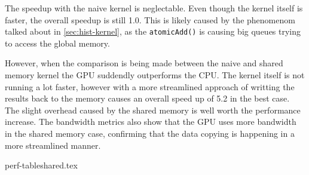 \documentclass[final]{report}
\begin{document}
The speedup with the naive kernel is neglectable.
Even though the kernel itself is faster, the overall speedup is still 1.0.
This is likely caused by the phenomenom talked about in \cref{sec:hist-kernel}, as the \texttt{atomicAdd()} is causing big queues trying to access the global memory.

However, when the comparison is being made between the naive and shared memory kernel the GPU suddendly outperforms the CPU.
The kernel itself is not running a lot faster, however with a more streamlined approach of writting the results back to the memory causes an overall speed up of 5.2 in the best case.
The slight overhead caused by the shared memory is well worth the performance increase.
The bandwidth metrics also show that the GPU uses more bandwidth in the shared memory case, confirming that the data copying is happening in a more streamlined manner.

{perf-tableshared.tex}
\end{document}
